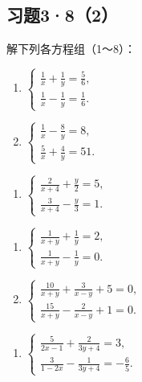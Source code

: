 \subsection{习题3·8（2）}

解下列各方程组（1～8）：

\begin{enumerate}[start=1]
\item
  \(\left\{ \begin{array}{l} \frac{1}{x} + \frac{1}{y} = \frac{5}{6}, \\ \frac{1}{x} - \frac{1}{y} = \frac{1}{6}. \end{array} \right.\)
\item
  \(\left\{ \begin{array}{l} \frac{1}{x} - \frac{8}{y} = 8, \\ \frac{5}{x} + \frac{4}{y} = 51. \end{array} \right.\)
\end{enumerate}

\begin{enumerate}[start=8]
\item
  \(\left\{ \begin{array}{l} \frac{2}{x + 4} + \frac{y}{2} = 5, \\ \frac{3}{x + 4} - \frac{y}{3} = 1. \end{array} \right.\)
\end{enumerate}

\begin{enumerate}[start=4]
\item
  \(\left\{ \begin{array}{l} \frac{1}{x + y} + \frac{1}{y} = 2, \\ \frac{1}{x + y} - \frac{1}{y} = 0. \end{array} \right.\)
\item
  \(\left\{ \begin{array}{l} \frac{10}{x + y} + \frac{3}{x - y} + 5 = 0, \\ \frac{15}{x + y} - \frac{2}{x - y} + 1 = 0. \end{array} \right.\)
\end{enumerate}

\begin{enumerate}[start=6]
\item
  \(\left\{ \begin{array}{l} \frac{5}{2x - 1} + \frac{2}{3y + 4} = 3, \\ \frac{3}{1 - 2x} - \frac{1}{3y + 4} = -\frac{6}{5}. \end{array} \right.\)
\end{enumerate}

